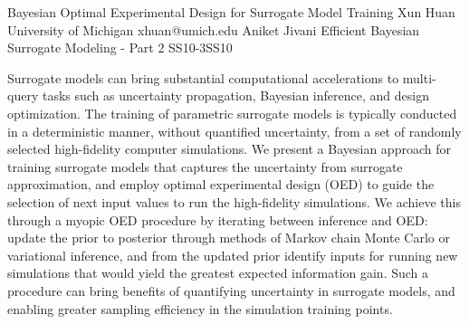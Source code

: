 \begin{talk}
   {Bayesian Optimal Experimental Design for Surrogate Model Training}%
  {Xun Huan}%
  {University of Michigan}%
  {xhuan@umich.edu}%
  {Aniket Jivani}%
{Efficient Bayesian Surrogate Modeling - Part 2}
{}{SS10-3}{SS10}

			
Surrogate models can bring substantial computational accelerations to multi-query tasks such as uncertainty propagation, Bayesian inference, and design optimization. The training of parametric surrogate models is typically conducted in a deterministic manner, without quantified uncertainty, from a set of randomly selected high-fidelity computer simulations. 
We present a Bayesian approach for training surrogate models that captures the uncertainty from surrogate approximation, and employ optimal experimental design (OED) to guide the selection of next input values to run the high-fidelity simulations. We achieve this through a myopic OED procedure by iterating between inference and OED: update the prior to posterior through methods of Markov chain Monte Carlo or variational inference, and from the updated prior identify inputs for running new simulations that would yield the greatest expected information gain. Such a procedure can bring benefits of quantifying uncertainty in surrogate models, and enabling greater sampling efficiency in the simulation training points. 


\medskip


\end{talk}


